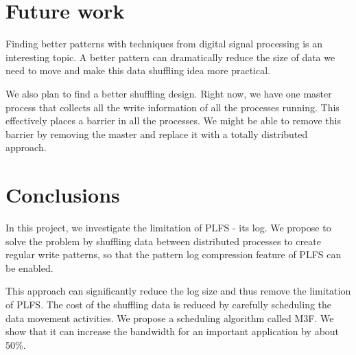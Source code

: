 \documentclass{acm_proc_article-sp}
\begin{document}
\section{Future work}
\label{sec:future-work}
Finding better patterns with techniques
from digital signal processing is an interesting
topic. A better pattern can dramatically
reduce the size of data we need
to move and make this data shuffling
idea more practical. 

We also plan to find a better shuffling
design. Right now, we have one master process
that collects all the write information of all
the processes running. This effectively
places a barrier in all the processes. We
might be able to remove this barrier by
removing the master and replace it with a
totally distributed approach.


\section{Conclusions}
\label{sec:conclusions}
In this project, we investigate
the limitation of PLFS - its log.
We propose to solve the problem
by shuffling data between
distributed processes to create 
regular write patterns, so that
the pattern log compression feature
of PLFS can be enabled. 

This approach can significantly
reduce the log size and thus remove
the limitation of PLFS. The cost
of the shuffling data is reduced
by carefully scheduling the data movement
activities. We propose a scheduling
algorithm called M3F. We show
that it can increase the bandwidth
for an important application by about 50\%.



  
\end{document}
